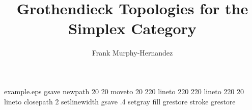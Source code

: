 %
%
%
%
%
\begin{filecontents*}{example.eps}
gsave
newpath
  20 20 moveto
  20 220 lineto
  220 220 lineto
  220 20 lineto
closepath
2 setlinewidth
gsave
  .4 setgray fill
grestore
stroke
grestore
\end{filecontents*}
%
\RequirePackage{fix-cm}
%
\documentclass[smallextended]{svjour3}       %
%
\smartqed  %
%
\usepackage{graphicx}
%
%
%
%
%


\title{Grothendieck Topologies for the Simplex Category}



\author{Frank Murphy-Hernandez}




